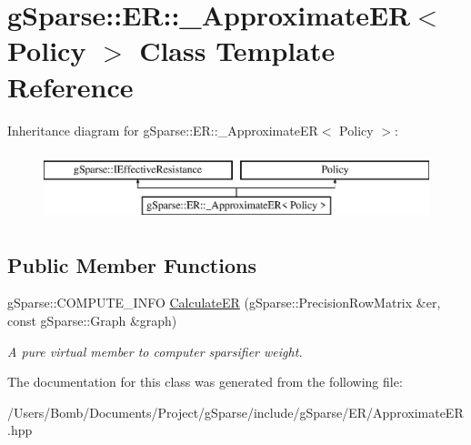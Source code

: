 \hypertarget{classg_sparse_1_1_e_r_1_1___approximate_e_r}{}\section{g\+Sparse\+:\+:ER\+:\+:\+\_\+\+Approximate\+ER$<$ Policy $>$ Class Template Reference}
\label{classg_sparse_1_1_e_r_1_1___approximate_e_r}
Inheritance diagram for g\+Sparse\+:\+:ER\+:\+:\+\_\+\+Approximate\+ER$<$ Policy $>$\+:\begin{figure}[H]
\begin{center}
\leavevmode
\includegraphics[height=2.000000cm]{classg_sparse_1_1_e_r_1_1___approximate_e_r}
\end{center}
\end{figure}
\subsection*{Public Member Functions}
\begin{DoxyCompactItemize}
\item 
\mbox{\label{classg_sparse_1_1_e_r_1_1___approximate_e_r_abf16cea687d1129e1a13b4af0db44892}} 
g\+Sparse\+::\+C\+O\+M\+P\+U\+T\+E\+\_\+\+I\+N\+FO \mbox{\hyperlink{classg_sparse_1_1_e_r_1_1___approximate_e_r_abf16cea687d1129e1a13b4af0db44892}{Calculate\+ER}} (g\+Sparse\+::\+Precision\+Row\+Matrix \&er, const g\+Sparse\+::\+Graph \&graph)
\begin{DoxyCompactList}\small\item\em A pure virtual member to computer sparsifier weight. \end{DoxyCompactList}\end{DoxyCompactItemize}


The documentation for this class was generated from the following file\+:\begin{DoxyCompactItemize}
\item 
/\+Users/\+Bomb/\+Documents/\+Project/g\+Sparse/include/g\+Sparse/\+E\+R/Approximate\+E\+R.\+hpp\end{DoxyCompactItemize}
